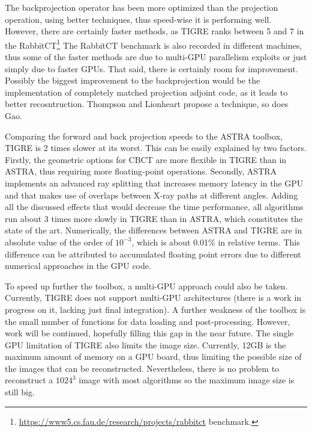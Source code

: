 The backprojection operator has been more optimized than the projection operation, using better techniques, thus speed-wise it is performing well. However, there are certainly faster methods, as TIGRE ranks between 5 and 7 in the RabbitCT\footnote{\href{https://www5.cs.fau.de/research/projects/rabbitct}{https://www5.cs.fau.de/research/projects/rabbitct} benchmark.} The RabbitCT benchmark is also recorded in different machines, thus some of the faster methods are due to multi-GPU parallelism exploits or just simply due to faster GPUs. That said, there is certainly room for improvement. 
Possibly the biggest improvement to the backprojection  would be the implementation of completely matched projection adjoint code, as it leads to better recosntruction\cite{6829349}. Thompson and Lionheart\cite{thompson2014gpu} propose a technique, so does Gao\cite{gao2012fast}.

Comparing the forward and back projection speeds to the ASTRA toolbox\cite{ASTRA}, TIGRE is 2 times slower at its worst. This can be easily explained by two factors. Firstly, the geometric options for CBCT are more flexible in TIGRE than in ASTRA, thus requiring more floating-point operations. Secondly, ASTRA implements an advanced ray splitting that increases memory latency in the GPU and that makes use of overlaps between X-ray paths at different angles\cite{Palenstijn2011250}. Adding all the discussed effects that would decrease the time performance, all algorithms run about 3 times more slowly in TIGRE than in ASTRA, which constitutes the state of the art. {Numerically, the differences between ASTRA and TIGRE are in absolute value of the order of $10^{-3}$, which is about 0.01\% in relative terms. This difference can be attributed to accumulated floating point errors due to different numerical approaches in the GPU code.}

To speed up further the toolbox, a multi-GPU approach could also be taken. Currently, TIGRE does not support multi-GPU architectures (there is a work in progress on it, lacking just final integration). A further weakness of the toolbox is the small number of functions for data loading and post-processing. However, work will be continued, hopefully filling this gap in the near future. The single GPU limitation of TIGRE also limits the image size. Currently, 12GB is the maximum amount of memory on a GPU board, thus limiting the possible size of the images that can be reconstructed. Nevertheless, there is no problem to reconstruct a $1024^3$ image with most algorithms so the maximum image size is still big.

